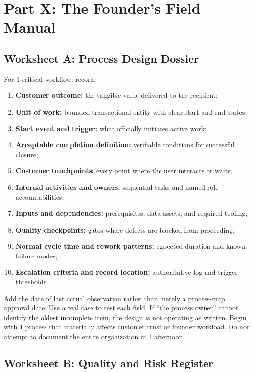 \section*{Part X: The Founder's Field Manual}

\subsection{Worksheet A: Process Design Dossier}
\label{sec:worksheet_a_process_dossier}

For 1 critical workflow, record:
\begin{enumerate}
    \item \textbf{Customer outcome:} the tangible value delivered to the recipient;
    \item \textbf{Unit of work:} bounded transactional entity with clear start and end states;
    \item \textbf{Start event and trigger:} what officially initiates active work;
    \item \textbf{Acceptable completion definition:} verifiable conditions for successful closure;
    \item \textbf{Customer touchpoints:} every point where the user interacts or waits;
    \item \textbf{Internal activities and owners:} sequential tasks and named role accountabilities;
    \item \textbf{Inputs and dependencies:} prerequisites, data assets, and required tooling;
    \item \textbf{Quality checkpoints:} gates where defects are blocked from proceeding;
    \item \textbf{Normal cycle time and rework patterns:} expected duration and known failure modes;
    \item \textbf{Escalation criteria and record location:} authoritative log and trigger thresholds.
\end{enumerate}

Add the date of last actual observation rather than merely a process-map approval date. Use a real case to test each field. If ``the process owner'' cannot identify the oldest incomplete item, the design is not operating as written. Begin with 1 process that materially affects customer trust or founder workload. Do not attempt to document the entire organization in 1 afternoon.

\subsection{Worksheet B: Quality and Risk Register}
\label{sec:worksheet_b_risk_register}

